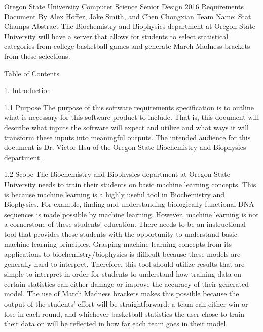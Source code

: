 \documentclass[letterpaper, 10pt,titlepage]{article}
\begin{document}
\begin{center}

Oregon State University Computer Science Senior Design 2016
\bigbreak
Requirements Document
\bigbreak
By Alex Hoffer, Jake Smith, and Chen Chongxian
\bigbreak
Team Name: Stat Champs
\bigbreak
\vspace{3.0cm}
 Abstract
\bigbreak
The Biochemistry and Biophysics department at Oregon State University will have a server that allows for students to select statistical categories from college basketball games and generate March Madness brackets from these selections.
\newpage
\end{center}

\begin{section}{Table of Contents}
\end{section}

\begin{section}{1. Introduction}
\end{section}

\begin{section}{1.1 Purpose}
The purpose of this software requirements specification is to outline what is necessary for this software product to include. That is, this document will describe what inputs the software will expect and utilize and what ways it will transform these inputs into meaningful outputs. The intended audience for this document is Dr. Victor Hsu of the Oregon State Biochemistry and Biophysics department.
\end{section}


\begin{section}{1.2 Scope}
The Biochemistry and Biophysics department at Oregon State University needs to train their students on basic machine learning concepts. This is because machine learning is a highly useful tool in Biochemistry and Biophysics. For example, finding and understanding biologically functional DNA sequences is made possible by machine learning. However, machine learning is not a cornerstone of these students’ education. There needs to be an instructional tool that provides these students with the opportunity to understand basic machine learning principles. Grasping machine learning concepts from its applications to biochemistry/biophysics is difficult because these models are generally hard to interpret. Therefore, this tool should utilize results that are simple to interpret in order for students to understand how training data on certain statistics can either damage or improve the accuracy of their generated model. The use of March Madness brackets makes this possible because the output of the students’ effort will be straightforward: a team can either win or lose in each round, and whichever basketball statistics the user chose to train their data on will be reflected in how far each team goes in their model.
\end{section}
\end{document}
